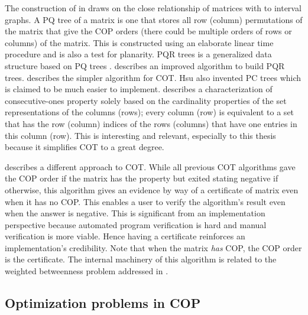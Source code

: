 The construction of \PQtrees in \cite{bl76} draws on the close
relationship of matrices with \COP to interval graphs. A PQ tree of a
matrix is one that stores all row (column) permutations of the matrix
that give the COP orders (there could be multiple orders of rows or
columns) of the matrix. This is constructed using an elaborate linear
time procedure and is also a test for planarity.  PQR trees
is a generalized data structure based on PQ trees \cite{mm96,mpt98}.
\cite{tm05} describes an improved algorithm to build PQR
trees. \cite{wlh02} describes the
simpler algorithm for COT. Hsu also invented PC trees
\cite{wlh01}
which is claimed to be much easier to implement. \cite{nsnrs09}
describes a characterization of consecutive-ones property solely based
on the cardinality properties of the set representations of the
columns (rows); every column (row) is equivalent to a set that has the
row (column) indices of the rows (columns) that have one entries in
this column (row). This is interesting and relevant, especially to
this thesis because it simplifies COT to a great degree. 

\cite{mcc04} describes a different approach to COT. While all previous
COT algorithms gave the COP order if the matrix has the property but
exited stating negative if otherwise, this algorithm gives an evidence
by way of a certificate of matrix even when it has no COP. This
enables a user to verify the algorithm's result even when the answer
is negative. This is significant from an implementation perspective
because automated program verification is hard and manual verification
is more viable. Hence having a certificate reinforces an
implementation's credibility. Note that when the matrix {\em has} COP,
the COP order is the certificate.  The internal machinery of this
algorithm is related to the weighted betweenness problem
addressed in \cite{co98}.  


\subsection{Optimization problems in COP}
\label{sec:optcop}

